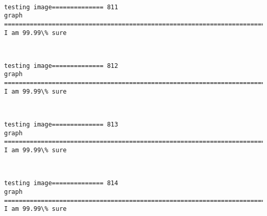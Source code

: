 \documentclass[11pt]{article}
\begin{document}
    \begin{center}
    \end{center}
    { \hspace*{\fill} \\}
    
    \begin{Verbatim}[commandchars=\\\{\}]
testing image============== 811
graph
============================================================================
I am 99.99\% sure

    \end{Verbatim}

    \begin{center}
    \end{center}
    { \hspace*{\fill} \\}
    
    \begin{Verbatim}[commandchars=\\\{\}]
testing image============== 812
graph
============================================================================
I am 99.99\% sure

    \end{Verbatim}

    \begin{center}
    \end{center}
    { \hspace*{\fill} \\}
    
    \begin{Verbatim}[commandchars=\\\{\}]
testing image============== 813
graph
============================================================================
I am 99.99\% sure

    \end{Verbatim}

    \begin{center}
    \end{center}
    { \hspace*{\fill} \\}
    
    \begin{Verbatim}[commandchars=\\\{\}]
testing image============== 814
graph
============================================================================
I am 99.99\% sure

    \end{Verbatim}
\end{document}
